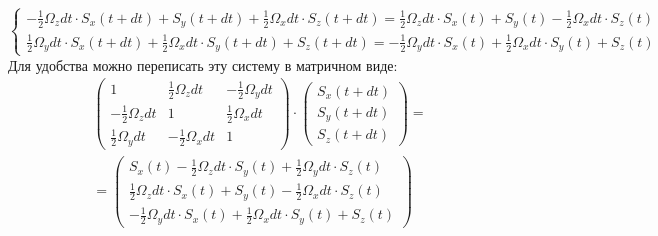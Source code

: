 \documentclass[12pt,oneside]{book}
\begin{document}
{$$\begin{cases}
		{{ -\frac{1}{2}\Omega_z{dt}}\cdot{S_x(t+dt)}}+{S_y(t+dt)}+{{\frac{1}{2}\Omega_x{dt}}\cdot{S_z(t+dt)}} = {\frac{1}{2}\Omega_z{dt}}\cdot{S_x(t)} + {S_y(t)} - {\frac{1}{2}\Omega_x{dt}}\cdot{S_z(t)} \\
		{{\frac{1}{2}\Omega_y{dt}}\cdot{S_x(t+dt)}}+{{\frac{1}{2}\Omega_x{dt}}\cdot{S_y(t+dt)}}+{S_z(t+dt)} = -{\frac{1}{2}\Omega_y{dt}}\cdot{S_x(t)} + {\frac{1}{2}\Omega_x{dt}}\cdot{S_y(t)} + {S_z(t)}
	\end{cases}$$
	Для удобства можно переписать эту систему в матричном виде:
	\begin{eqnarray*}
		\begin{pmatrix}
			 1& \frac{1}{2}\Omega_z{dt}& -\frac{1}{2}\Omega_y{dt}\\
			  -\frac{1}{2}\Omega_z{dt}& 1& \frac{1}{2}\Omega_x{dt}\\
			  \frac{1}{2}\Omega_y{dt}& -\frac{1}{2}\Omega_x{dt}& 1
		\end{pmatrix}
		\cdot
		\begin{pmatrix}
			 S_x(t + dt)\\
			 S_y(t + dt)\\
			 S_z(t + dt)
		\end{pmatrix}
		=  \\ =
		\begin{pmatrix}
			 {S_x(t)} - {\frac{1}{2}\Omega_z{dt}}\cdot{S_y(t)} + {\frac{1}{2}\Omega_y{dt}}\cdot{S_z(t)}\\
			 {\frac{1}{2}\Omega_z{dt}}\cdot{S_x(t)} + {S_y(t)} - {\frac{1}{2}\Omega_x{dt}}\cdot{S_z(t)}\\
			 -{\frac{1}{2}\Omega_y{dt}}\cdot{S_x(t)} + {\frac{1}{2}\Omega_x{dt}}\cdot{S_y(t)} + {S_z(t)}
		\end{pmatrix}
	\end{eqnarray*}

}
\end{document}
